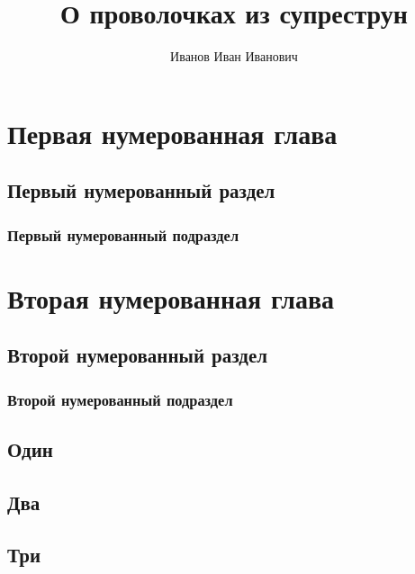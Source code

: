 \documentclass[a4paper,14pt]{extreport}
\title{О проволочках из супреструн}
\author{Иванов Иван Иванович}
\begin{document}
  \maketitle

  {
    \renewcommand{\contentsname}{Содержание}
    \tableofcontents
  }

  \chapter{Первая нумерованная глава}
  \label{c:first_num_chap}

  \section{Первый нумерованный раздел}
  \label{s:first_num_sec}
  \blindmathpaper
  \subsection{Первый нумерованный подраздел}
  \label{ss:first_num_subsec}
  \blindmathpaper

  \chapter{Вторая нумерованная глава}
  \label{c:second_num_chap}
  \blindmathpaper
  \section{Второй нумерованный раздел}
  \label{s:second_num_sec}
  \blindmathpaper
  \subsection{Второй нумерованный подраздел}
  \label{ss:second_num_subsec}
  \blindmathpaper

  \appendix
  \section{Один}
  \blindmathpaper
  \section{Два}
  \blindmathpaper
  \section{Три}
  \blindmathpaper

  
\end{document}
